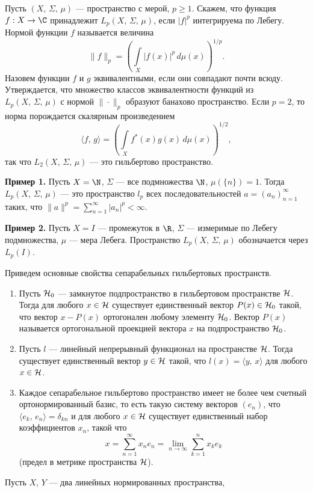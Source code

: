 \documentclass[a4paper
]{article}
\begin{document}
Пусть $(X, \, \Sigma, \, \mu)$ --- пространство с мерой, $p\ge 1$.
Скажем, что функция $f:X\rightarrow \C$ принадлежит $L_p(X, \, \Sigma, \,
\mu)$, если $|f|^p$ интегрируема по Лебегу. Нормой функции
$f$ называется величина $$\|f\|_p=\left(\int \limits_X |f(x)|^p\,
d\mu(x)\right)^{1/p}.$$ Назовем функции $f$ и $g$ эквивалентными,
если они совпадают почти всюду. Утверждается, что множество
классов эквивалентности функций из $L_p(X, \, \Sigma, \, \mu)$
с нормой $\|\cdot\|_p$ образуют банахово пространство. Если
$p=2$, то норма порождается скалярным произведением $$\langle f, \,
g\rangle=\left(\int \limits_{X}f^*(x)g(x)\, d\mu(x)\right)^{1/2},$$
так что $L_2(X, \, \Sigma, \, \mu)$ --- это гильбертово пространство. \par
{\bf Пример 1.} Пусть $X=\N$, $\Sigma$ --- все подмножества $\N$,
$\mu(\{n\})=1$. Тогда $L_p(X, \, \Sigma, \, \mu)$ --- это
пространство $l_p$ всех последовательностей $a=(a_n)_{n=1}^\infty$
таких, что $\|a\|^p=\sum \limits_{n=1}^\infty |a_n|^p<\infty$. \par
{\bf Пример 2.} Пусть $X=I$ --- промежуток в $\R$, $\Sigma$ ---
измеримые по Лебегу подмножества, $\mu$ --- мера Лебега. Пространство
$L_p(X, \, \Sigma, \, \mu)$ обозначается через $L_p(I)$. \par
Приведем основные свойства сепарабельных гильбертовых пространств.
\begin{enumerate}
\item Пусть ${\cal H}_0$ --- замкнутое подпространство в гильбертовом
пространстве ${\cal H}$. Тогда для любого $x\in {\cal H}$
существует единственный вектор $P(x)\in {\cal H}_0$ такой, что
вектор $x-P(x)$ ортогонален любому элементу ${\cal H}_0$. Вектор
$P(x)$ называется ортогональной проекцией вектора $x$ на подпространство
${\cal H}_0$.
\item Пусть $l$ --- линейный непрерывный функционал на пространстве
${\cal H}$. Тогда существует единственный вектор $y\in {\cal H}$
такой, что $l(x)=\langle y, \, x\rangle$ для любого $x\in {\cal H}$.
\item Каждое сепарабельное гильбертово пространство имеет
не более чем счетный ортонормированный базис, то есть такую систему
векторов $(e_n)$, что $\langle e_k, \, e_n\rangle =\delta_{kn}$
и для любого $x\in {\cal H}$ существует единственный набор
коэффициентов $x_n$, такой что $$x=\sum \limits_{n=1}^\infty x_ne_n=
\lim \limits_{n\rightarrow \infty}\sum \limits_{k=1}^n x_ke_k$$
(предел в метрике пространства ${\cal H}$).
\end{enumerate}
Пусть $X$, $Y$ --- два линейных нормированных пространства,
\end{document}
